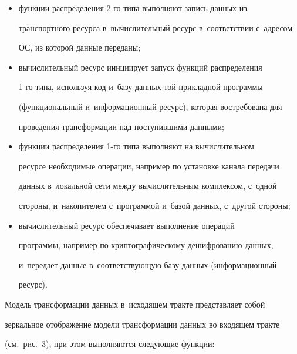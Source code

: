   \begin{itemize}

\item функции распределения 2-го типа выполняют запись данных из 

транспортного ресурса в~вы\-чис\-ли\-тель\-ный ресурс в~соответствии с~адресом 

ОС, из которой данные переданы;

\item вычислительный ресурс инициирует запуск функций распределения  

1-го типа, используя код и~базу данных той при\-клад\-ной программы 

(функциональный и~информационный ресурс), которая востребована для 

проведения трансформации над по\-сту\-пив\-ши\-ми данными;

\item функции распределения 1-го типа выполняют на вы\-чис\-ли\-тель\-ном 

ресурсе необходимые операции, например по установке канала передачи 

данных в~локальной сети между вы\-чис\-ли\-тель\-ным комплексом, с~одной 

стороны, и~накопителем с~программой и~базой данных, с~другой стороны;

\item вычислительный ресурс обеспечивает выполнение операций 

программы, например по криптографическому де\-шиф\-ро\-ва\-нию данных, 

и~передает данные в~со\-от\-вет\-ст\-ву\-ющую базу данных (информационный 

ре\-сурс).

\end{itemize}

  

  Модель трансформации данных в~исходящем тракте пред\-став\-ля\-ет собой 

зеркальное отоб\-ра\-же\-ние модели трансформации данных во входящем тракте 

(см.\ рис.~3), при этом выполняются сле\-ду\-ющие функ\-ции:

